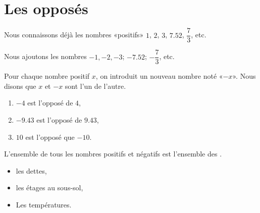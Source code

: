 



\section{Les opposés}

Nous connaissons déjà les nombres «positifs» $1$, $2$, $3$, \( 7.52\), \( \dfrac{ 7 }{ 3 }\), etc.
\begin{definition}
    Nous ajoutons les nombres \( -1, -2, -3\); \( -7.52\); \( -\dfrac{ 7 }{ 3 }\), etc. 

    Pour chaque nombre positif \( x\), on introduit un nouveau nombre noté «\( -x\)». Nous disons que \( x\) et \( -x\) sont  l'un de l'autre.
\end{definition}

\begin{example}
    \begin{enumerate}
        \item
            \( -4\) est l'opposé de $4$,
        \item
            \( -9.43\) est l'opposé de \( 9.43\),
        \item
            \( 10\) est l'opposé que \( -10\).
    \end{enumerate}
\end{example}

\begin{definition}
    L'ensemble de tous les nombres positifs et négatifs est l'ensemble des .
\end{definition}

\begin{example}
    \begin{itemize}
        \item les dettes,
        \item les étages au sous-sol,
        \item Les températures.
    \end{itemize}
\end{example}

